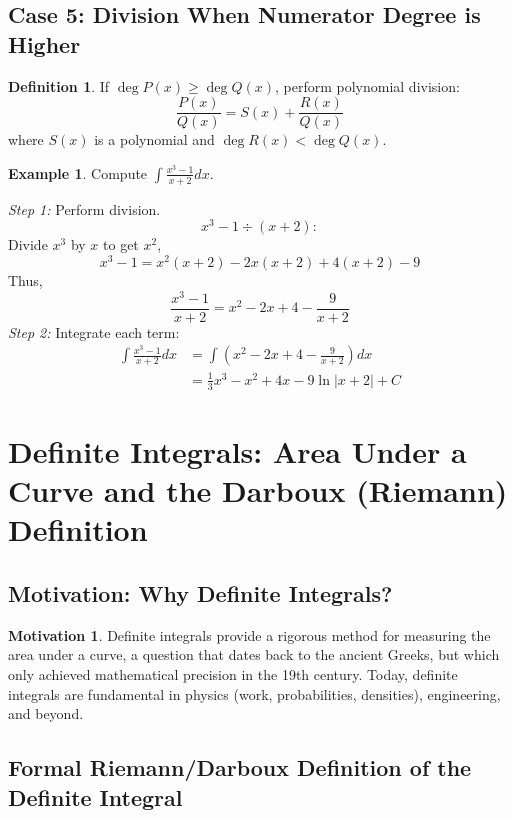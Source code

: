 \documentclass[11pt]{article}
\theoremstyle{definition}
\newtheorem{definition}{Definition}[section]
\newtheorem{examplex}{Example}[section]
\newtheorem*{motivation}{Motivation}
\theoremstyle{plain}
\begin{document}
\subsection{Case 5: Division When Numerator Degree is Higher}

\begin{definition}
If $\deg P(x) \geq \deg Q(x)$, perform polynomial division:
\[
\frac{P(x)}{Q(x)} = S(x) + \frac{R(x)}{Q(x)}
\]
where $S(x)$ is a polynomial and $\deg R(x) < \deg Q(x)$.
\end{definition}

\begin{examplex}
Compute $\displaystyle \int \frac{x^3 - 1}{x+2} dx$.

\emph{Step 1:} Perform division.
\[
x^3 - 1 \div (x+2):
\]
Divide $x^3$ by $x$ to get $x^2$,
\[
x^3 - 1 = x^2(x+2) - 2x(x+2) + 4(x+2) - 9
\]
Thus,
\[
\frac{x^3 - 1}{x+2} = x^2 - 2x + 4 - \frac{9}{x+2}
\]
\emph{Step 2:} Integrate each term:
\begin{align*}
\int \frac{x^3 - 1}{x+2} dx &= \int \left( x^2 - 2x + 4 - \frac{9}{x+2} \right) dx \\
&= \frac{1}{3} x^3 - x^2 + 4x - 9 \ln |x+2| + C
\end{align*}
\end{examplex}

\section{Definite Integrals: Area Under a Curve and the Darboux (Riemann) Definition}

\subsection{Motivation: Why Definite Integrals?}

\begin{motivation}
Definite integrals provide a rigorous method for measuring the area under a curve, a question that dates back to the ancient Greeks, but which only achieved mathematical precision in the 19th century. Today, definite integrals are fundamental in physics (work, probabilities, densities), engineering, and beyond.
\end{motivation}

\subsection{Formal Riemann/Darboux Definition of the Definite Integral}
\end{document}
